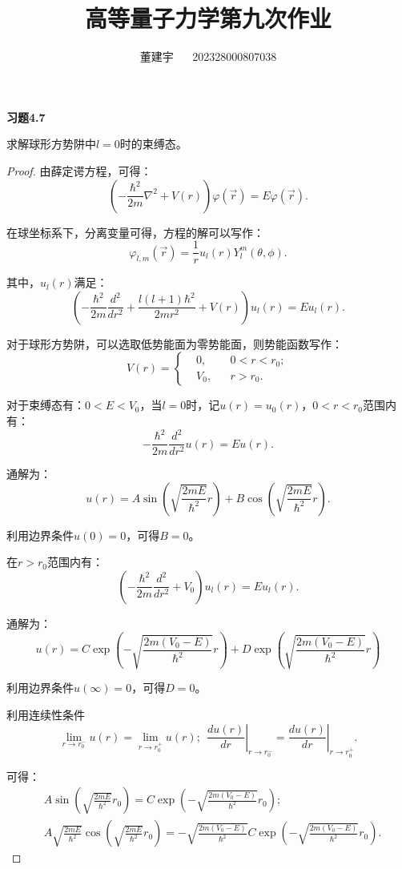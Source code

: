\documentclass[reqno,a4paper,12pt]{amsart}
\title{高等量子力学第九次作业}
\author{董建宇 ~~ 202328000807038}
\begin{document}
\maketitle

\textbf{习题4.7}

求解球形方势阱中$l=0$时的束缚态。

\begin{proof}
由薛定谔方程，可得：
\[
	\left( -\frac{\hbar^2}{2m} \nabla^2 + V(r) \right) \varphi(\vec{r}) = E \varphi(\vec{r}).
\]

在球坐标系下，分离变量可得，方程的解可以写作：
\[
	\varphi_{l,m}(\vec{r}) = \frac{1}{r}u_l(r) Y_l^m(\theta, \phi).
\]

其中，$u_l(r)$满足：
\[
	\left( -\frac{\hbar^2}{2m} \frac{d^2}{dr^2} + \frac{l(l+1)\hbar^2}{2mr^2} + V(r) \right) u_l(r) = E u_l(r).
\]

对于球形方势阱，可以选取低势能面为零势能面，则势能函数写作：
\[
	V(r) = \left\{ \begin{aligned}
		&0, & & 0<r<r_0; \\
		&V_0, & & r>r_0.
	\end{aligned} \right.
\]

对于束缚态有：$0<E<V_0$，当$l=0$时，记$u(r) = u_0(r)$，$0<r<r_0$范围内有：
\[
	-\frac{\hbar^2}{2m} \frac{d^2}{dr^2} u(r) = E u(r).
\]

通解为：
\[
	u(r) = A\sin\left( \sqrt{\frac{2mE}{\hbar^2}} r \right) + B\cos\left( \sqrt{\frac{2mE}{\hbar^2}} r \right).
\]

利用边界条件$u(0) = 0$，可得$B=0$。

在$r>r_0$范围内有：
\[
	\left( -\frac{\hbar^2}{2m} \frac{d^2}{dr^2} + V_0 \right) u_l(r) = E u_l(r).
\]

通解为：
\[
	u(r) = C \exp\left( -\sqrt{\frac{2m(V_0-E)}{\hbar^2}} r \right) + D \exp\left( \sqrt{\frac{2m(V_0-E)}{\hbar^2}} r \right)
\]

利用边界条件$u(\infty) = 0$，可得$D=0$。

利用连续性条件
\[
	\lim_{r\to r_0^-} u(r) = \lim_{r\to r_0^+} u(r); \ \ \left. \frac{du(r)}{dr} \right\vert_{r\to r_0^-} = \left. \frac{du(r)}{dr} \right\vert_{r\to r_0^+}.
\]

可得：
\begin{align*}
	&A\sin\left( \sqrt{\frac{2mE}{\hbar^2}} r_0 \right) = C \exp \left( -\sqrt{\frac{2m(V_0-E)}{\hbar^2}} r_0 \right); \\
	&A\sqrt{\frac{2mE}{\hbar^2}} \cos\left( \sqrt{\frac{2mE}{\hbar^2}} r_0 \right) = -\sqrt{\frac{2m(V_0-E)}{\hbar^2}} C \exp \left( -\sqrt{\frac{2m(V_0-E)}{\hbar^2}} r_0 \right).
\end{align*}


\end{proof}
\end{document}
